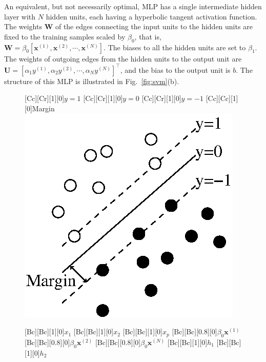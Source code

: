 \documentclass[dissertation,nocontribution,draft*]{aaltoseries}
\newcommand{\vect}[1]{\mathbf{#1}}
\newcommand{\matr}[1]{\mathbf{#1}}
\newcommand{\vx}[0]{\vect{x}}
\newcommand{\mW}[0]{\matr{W}}
\newcommand{\mU}[0]{\matr{U}}
\begin{document}
An equivalent, but not necessarily optimal, MLP has a
single intermediate hidden layer with $N$ hidden units, each
having a hyperbolic tangent activation function. The weights
$\mW$ of the edges connecting the input units to the hidden
units are fixed to the training samples scaled by $\beta_0$,
that is, $\mW = \beta_0 \left[ \vx^{(1)}, \vx^{(2)}, \cdots,
\vx^{(N)} \right]$. The biases to all the hidden units are
set to $\beta_1$. The weights of outgoing edges from the
hidden units to the output unit are $\mU = \left[ \alpha_1 y^{(1)}, \alpha_2 y^{(2)}, \cdots, \alpha_N y^{(N)}
\right]^\top$, and the bias to the output unit is $b$. The
structure of this MLP is illustrated in
Fig.~\ref{fig:svm}(b).

\begin{figure}[t]
    \begin{minipage}{0.48\textwidth}
        \centering
        [Cc][Cr][1][0]{$y=1$}
        [Cc][Cr][1][0]{$y=0$}
        [Cc][Cr][1][0]{$y=-1$}
        [Cc][Cc][1][0]{Margin}
        \includegraphics[width=0.75\columnwidth]{figures/svm_maxmargin.eps}
    \end{minipage}
    \begin{minipage}{0.48\textwidth}
        \centering
        [Bc][Bc][1][0]{$x_1$}
        [Bc][Bc][1][0]{$x_2$}
        [Bc][Bc][1][0]{$x_p$}
        [Bc][Bc][0.8][0]{$\beta_0 \vx^{(1)}$}
        [Bc][Bc][0.8][0]{$\beta_0 \vx^{(2)}$}
        [Bc][Bc][0.8][0]{$\beta_0 \vx^{(N)}$}
        [Bc][Bc][1][0]{$h_1$}
        [Bc][Bc][1][0]{$h_2$}

\end{minipage}
\end{figure}
\end{document}
